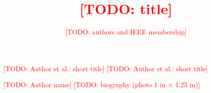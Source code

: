 \documentclass{ieeeaccess}
\newcommand{\todo}[1]{\textcolor{red}{[TODO: #1]}}
\begin{document}

\title{\todo{title}}
\author{\todo{authors and IEEE membership}}
\address[1]{\todo{affiliation and e-mail}}
\tfootnote{\todo{funding}}

\markboth
{\todo{Author et al.: short title}}
{\todo{Author et al.: short title}}

\corresp{\todo{corresponding author and e-mail}}



\titlepgskip=-21pt

\maketitle












\begin{IEEEbiographynophoto}{\todo{Author name}}
\todo{biography (photo 1 in $\times$ 1.25 in)}
\end{IEEEbiographynophoto}

\EOD
\end{document}
